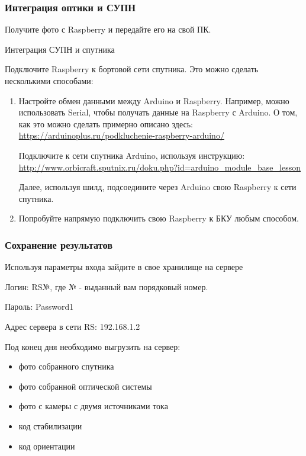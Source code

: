 \subsubsection*{Интеграция оптики и СУПН}

Получите фото с Raspberry и передайте его на свой ПК.

Интеграция СУПН и спутника

Подключите Raspberry к бортовой сети спутника. Это можно сделать несколькими способами:
\begin{enumerate}
    \item Настройте обмен данными между Arduino и Raspberry. Например, можно использовать Serial, чтобы получать данные на Raspberry с Arduino. О том, как это можно сделать примерно описано здесь: \url{https://arduinoplus.ru/podkluchenie-raspberry-arduino/}
    
    Подключите к сети спутника Arduino, используя инструкцию: \url{http://www.orbicraft.sputnix.ru/doku.php?id=arduino_module_base_lesson}

    Далее, используя шилд, подсоедините через Arduino свою Raspberry к сети спутника.
    \item  Попробуйте напрямую подключить свою Raspberry к БКУ любым способом.
\end{enumerate}

\subsubsection*{Сохранение результатов}

Используя параметры входа зайдите в свое хранилище на сервере

Логин: RS№, где № - выданный вам порядковый номер.

Пароль: Password1

Адрес сервера в сети RS: 192.168.1.2

Под конец дня необходимо выгрузить на сервер:
\begin{itemize}
    \item фото собранного спутника
    \item фото собранной оптической системы
    \item фото с камеры с двумя источниками тока
    \item код стабилизации
    \item код ориентации
\end{itemize}

\markSection

